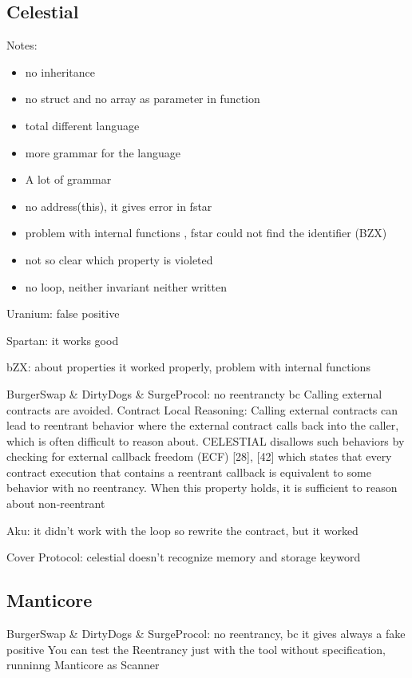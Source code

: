\subsection{Celestial}
Notes:
\begin{itemize}
    \item no inheritance
    \item no struct and no array as parameter in function 
    \item total different language 
    \item more grammar for the language 
    \item A lot of grammar 
    \item no address(this), it gives error in fstar
    \item problem with internal functions , fstar could not find the identifier (BZX) 
    \item not so clear which property is violeted  
    \item no loop, neither invariant neither written
\end{itemize}

Uranium: false positive

Spartan: it works good 

bZX: about properties it worked properly, problem with internal functions 

BurgerSwap \& DirtyDogs \& SurgeProcol: no reentrancty bc Calling external contracts are avoided.
Contract Local Reasoning: Calling external contracts
can lead to reentrant behavior where the external contract
calls back into the caller, which is often difficult to reason
about. CELESTIAL disallows such behaviors by checking for
external callback freedom (ECF) [28], [42] which states that
every contract execution that contains a reentrant callback is
equivalent to some behavior with no reentrancy. When this
property holds, it is sufficient to reason about non-reentrant

Aku: it didn't work with the loop so rewrite the contract, but it worked 

Cover Protocol: celestial doesn't recognize memory and storage keyword

\subsection {Manticore}

BurgerSwap \& DirtyDogs \& SurgeProcol: no reentrancy, bc it gives always a fake positive
You can test the Reentrancy just with the tool without specification, runninng Manticore as Scanner 

